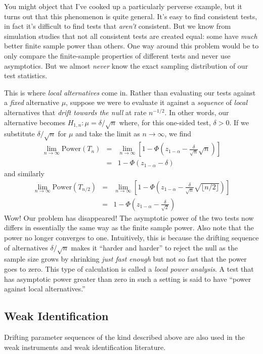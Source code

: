 You might object that I've cooked up a particularly perverse example, but it turns out that this phenomenon is quite general. 
It's easy to find consistent tests, in fact it's difficult to find tests that \emph{aren't} consistent. 
But we know from simulation studies that not all consistent tests are created equal: some have \emph{much} better finite sample power than others. 
One way around this problem would be to only compare the finite-sample properties of different tests and never use asymptotics. 
But we almost \emph{never} know the exact sampling distribution of our test statistics.

This is where \emph{local alternatives} come in.
Rather than evaluating our tests against a \emph{fixed} alternative $\mu$, suppose we were to evaluate it against a \emph{sequence} of \emph{local} alternatives that \emph{drift towards the null} at rate $n^{-1/2}$. 
In other words, our alternative becomes $H_{1,n} \colon \mu = \delta / \sqrt{n}$ where, for this one-sided test, $\delta > 0$. 
If we substitute $\delta/\sqrt{n}$ for $\mu$ and take the limit as $n\rightarrow \infty$, we find
\begin{eqnarray*}
\lim_{n\rightarrow \infty} \mbox{Power}(T_{n}) &=& \lim_{n\rightarrow \infty}\left[1 - \Phi\left(z_{1-\alpha} - \frac{\delta}{\sqrt{n}}\sqrt{n}\right) \right]\\
&=& 1 - \Phi\left(z_{1-\alpha} - \delta \right)
\end{eqnarray*}
and similarly
\begin{eqnarray*}
\lim_{n\rightarrow \infty} \mbox{Power}(T_{n/2}) &=& \lim_{n\rightarrow \infty}\left[1 - \Phi\left(z_{1-\alpha} - \frac{\delta}{\sqrt{n}}\sqrt{\lfloor n/2 \rfloor }\right) \right]\\
&=& 1 - \Phi\left(z_{1-\alpha} - \frac{\delta}{\sqrt{2}} \right)
\end{eqnarray*}
Wow! Our problem has disappeared! 
The asymptotic power of the two tests now differs in essentially the same way as the finite sample power. 
Also note that the power no longer converges to one.
Intuitively, this is because the drifting sequence of alternatives $\delta/\sqrt{n}$ makes it ``harder and harder'' to reject the null as the sample size grows by shrinking \emph{just fast enough} but not so fast that the power goes to zero. 
This type of calculation is called a \emph{local power analysis}. 
A test that has asymptotic power greater than zero in such a setting is said to have ``power against local alternatives.''


\subsection{Weak Identification}
Drifting parameter sequences of the kind described above are also used in the weak instruments and weak identification literature.


